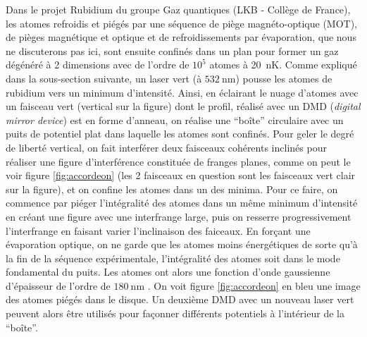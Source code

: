 \documentclass[11pt,a4paper] { article}
\newcommand{\lmbd}[1]{$\SI{#1}{\nano\metre}$}
\begin{document}
Dans le projet Rubidium du groupe Gaz quantiques (LKB - Collège de France), les atomes refroidis et piégés par une séquence de piège magnéto-optique (MOT), de pièges magnétique et optique et de refroidissements par évaporation, que nous ne discuterons pas ici, sont ensuite confinés dans un plan pour former un gaz dégénéré à 2 dimensions avec de l'ordre de $10^5$ atomes à \SI{20}{nK}. Comme expliqué dans la sous-section suivante, un laser vert (à \lmbd{532}) pousse les atomes de rubidium vers un minimum d'intensité. 
Ainsi, en éclairant le nuage d'atomes avec un faisceau vert (vertical sur la figure) dont le profil, réalisé avec un DMD (\textit{digital mirror device}) est en forme d'anneau, on réalise une ``boîte'' circulaire avec un puits de potentiel plat dans laquelle les atomes sont confinés. Pour geler le degré de liberté vertical, on fait interférer deux faisceaux cohérents inclinés pour réaliser une figure d'interférence constituée de franges planes, comme on peut le voir figure \ref{fig:accordeon} (les 2 faisceaux en question sont les faisceaux vert clair sur la figure), et on confine les atomes dans un des minima. Pour ce faire, on commence par piéger l'intégralité des atomes dans un même minimum d'intensité en créant une figure avec une interfrange large, puis on resserre progressivement l'interfrange en faisant varier l'inclinaison des faiceaux. En forçant une évaporation optique, on ne garde que les atomes moins énergétiques de sorte qu'à la fin de la séquence expérimentale, l'intégralité des atomes soit dans le mode fondamental du puits. Les atomes ont alors une fonction d'onde gaussienne d'épaisseur de l'ordre de \lmbd{180} \citep{brice}. On voit figure \ref{fig:accordeon} en bleu une image des atomes piégés dans le disque. Un deuxième DMD avec un nouveau laser vert peuvent alors être utilisés pour façonner différents potentiels à l'intérieur de la ``boîte''.
\end{document}
